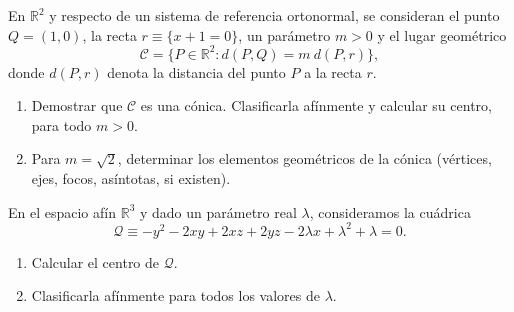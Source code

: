\documentclass[12pt]{article}
\begin{document}
    \begin{ejercicio}[2,5 puntos] En $\mathbb{R}^{2}$ y respecto de un sistema de referencia ortonormal, se consideran el punto $Q=(1,0)$, la recta $r\equiv\{x+1=0\}$, un parámetro $m>0$ y el lugar geométrico
    $$\mathcal{C}=\{P\in\mathbb{R}^{2}:d(P,Q)=m~d(P,r)\},$$
    donde $d(P,r)$ denota la distancia del punto $P$ a la recta $r$.
        \begin{enumerate}
            \item Demostrar que $\mathcal{C}$ es una cónica. Clasificarla afínmente y calcular su centro, para todo $m>0$.
            \item Para $m=\sqrt{2}$, determinar los elementos geométricos de la cónica (vértices, ejes, focos, asíntotas, si existen).
        \end{enumerate}
    \end{ejercicio}

    \begin{ejercicio}[2,5 puntos] En el espacio afín $\mathbb{R}^{3}$ y dado un parámetro real $\lambda$, consideramos la cuádrica
    $$\mathcal{Q}\equiv-y^{2}-2xy+2xz+2yz-2\lambda x+\lambda^{2}+\lambda=0.$$
        \begin{enumerate}
            \item Calcular el centro de $\mathcal{Q}$.
            \item Clasificarla afínmente para todos los valores de $\lambda$.
        \end{enumerate}
    \end{ejercicio}
\end{document}
